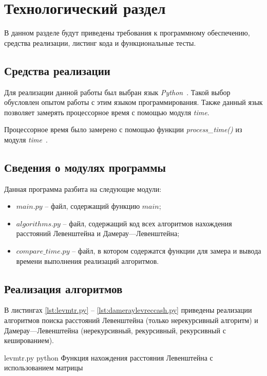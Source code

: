 \chapter{Технологический раздел}

В данном разделе будут приведены требования к программному обеспечению, средства реализации, листинг кода и функциональные тесты.

\section{Средства реализации}

Для реализации данной работы был выбран язык \textit{Python}~\cite{python}. Такой выбор обусловлен опытом работы с этим языком программирования. Также данный язык позволяет замерять процессорное время с помощью модуля \textit{time}.

Процессорное время было замерено с помощью функции \textit{process\_time()} из модуля \textit{time}~\cite{python-time}.

\section{Сведения о модулях программы}

Данная программа разбита на следующие модули:
\begin{itemize}
	\item $main.py$ -- файл, содержащий функцию $main$;
	\item $algorithms.py$ -- файл, содержащий код всех алгоритмов нахождения расстояний Левенштейна и Дамерау---Левенштейна;
	\item $compare\_time.py$ -- файл, в котором содержатся функции для замера и вывода времени выполнения реализаций алгоритмов.
\end{itemize}

\section{Реализация алгоритмов}

В листингах \ref{lst:levmtr.py} -- \ref{lst:dameraylevreccash.py} приведены реализации алгоритмов поиска расстояний Левенштейна (только нерекурсивный алгоритм) и Дамерау---Левенштейна (нерекурсивный, рекурсивный, рекурсивный с кешированием).

\clearpage

{levmtr.py} %
{python} %
{Функция нахождения расстояния Левенштейна с использованием матрицы} %

